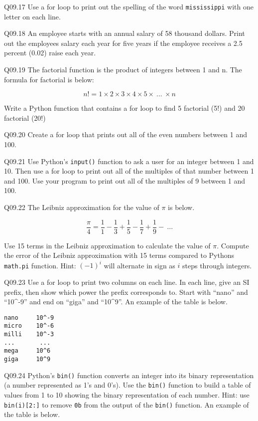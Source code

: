 \documentclass{book}
\newenvironment{problems}{}{}  %
\newcommand{\passthrough}[1]{#1}
\begin{document}
\begin{problems}
Q09.17 Use a for loop to print out the spelling of the word
\passthrough{\lstinline!mississippi!} with one letter on each line.

Q09.18 An employee starts with an annual salary of 58 thousand dollars.
Print out the employees salary each year for five years if the employee
receives a 2.5 percent (0.02) raise each year.

Q09.19 The factorial function is the product of integers between 1 and
n. The formula for factorial is below:

\[ n! = 1 \times 2 \times 3 \times 4 \times 5 \times \ ... \ \times n \]

Write a Python function that contains a for loop to find 5 factorial
(5!) and 20 factorial (20!)

Q09.20 Create a for loop that prints out all of the even numbers between
1 and 100.

Q09.21 Use Python's \passthrough{\lstinline!input()!} function to ask a
user for an integer between 1 and 10. Then use a for loop to print out
all of the multiples of that number between 1 and 100. Use your program
to print out all of the multiples of 9 between 1 and 100.

Q09.22 The Leibniz approximation for the value of \(\pi\) is below.

\[ \frac{\pi}{4} = \frac{1}{1} - \frac{1}{3} + \frac{1}{5} - \frac{1}{7} + \frac{1}{9} - \ ... \]

Use 15 terms in the Leibniz approximation to calculate the value of
\(\pi\). Compute the error of the Leibniz approximation with 15 terms
compared to Pythons \passthrough{\lstinline!math.pi!} function. Hint:
\((-1)^i\) will alternate in sign as \(i\) steps through integers.

Q09.23 Use a for loop to print two columns on each line. In each line,
give an SI prefix, then show which power the prefix corresponds to.
Start with ``nano'' and ``10\^{}-9'' and end on ``giga'' and
``10\^{}9''. An example of the table is below.

\begin{lstlisting}
nano     10^-9
micro    10^-6
milli    10^-3
...       ...
mega     10^6
giga     10^9
\end{lstlisting}

Q09.24 Python's \passthrough{\lstinline!bin()!} function converts an
integer into its binary representation (a number represented as 1's and
0's). Use the \passthrough{\lstinline!bin()!} function to build a table
of values from 1 to 10 showing the binary representation of each number.
Hint: use \passthrough{\lstinline!bin(i)[2:]!} to remove
\passthrough{\lstinline!0b!} from the output of the
\passthrough{\lstinline!bin()!} function. An example of the table is
below.


\end{problems}
\end{document}
